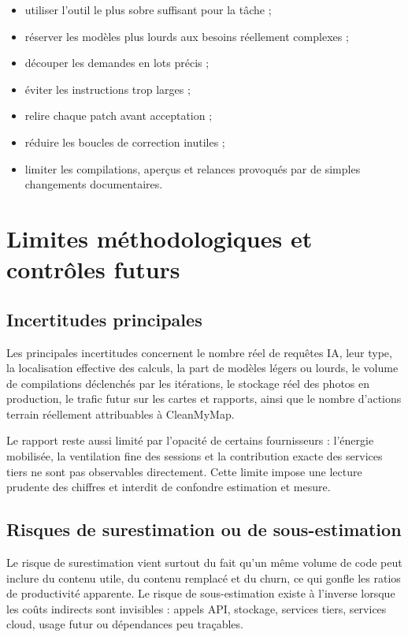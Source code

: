 \documentclass[
  10pt,
  a4paper,
  DIV=11,
  numbers=noendperiod,
  oneside]{scrreprt}
\providecommand{\tightlist}{%
  \setlength{\itemsep}{0pt}\setlength{\parskip}{0pt}}
\begin{document}
\begin{itemize}
\tightlist
\item
  utiliser l'outil le plus sobre suffisant pour la tâche ;
\item
  réserver les modèles plus lourds aux besoins réellement complexes ;
\item
  découper les demandes en lots précis ;
\item
  éviter les instructions trop larges ;
\item
  relire chaque patch avant acceptation ;
\item
  réduire les boucles de correction inutiles ;
\item
  limiter les compilations, aperçus et relances provoqués par de simples
  changements documentaires.
\end{itemize}

\section{Limites méthodologiques et contrôles
futurs}\label{limites-muxe9thodologiques-et-contruxf4les-futurs}

\subsection{Incertitudes principales}\label{incertitudes-principales}

Les principales incertitudes concernent le nombre réel de requêtes IA,
leur type, la localisation effective des calculs, la part de modèles
légers ou lourds, le volume de compilations déclenchés par les
itérations, le stockage réel des photos en production, le trafic futur
sur les cartes et rapports, ainsi que le nombre d'actions terrain
réellement attribuables à CleanMyMap.

Le rapport reste aussi limité par l'opacité de certains fournisseurs :
l'énergie mobilisée, la ventilation fine des sessions et la contribution
exacte des services tiers ne sont pas observables directement. Cette
limite impose une lecture prudente des chiffres et interdit de confondre
estimation et mesure.

\subsection{Risques de surestimation ou de
sous-estimation}\label{risques-de-surestimation-ou-de-sous-estimation}

Le risque de surestimation vient surtout du fait qu'un même volume de
code peut inclure du contenu utile, du contenu remplacé et du churn, ce
qui gonfle les ratios de productivité apparente. Le risque de
sous-estimation existe à l'inverse lorsque les coûts indirects sont
invisibles : appels API, stockage, services tiers, services cloud, usage
futur ou dépendances peu traçables.
\end{document}
